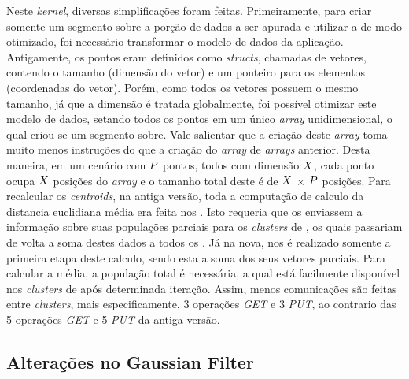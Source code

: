 \documentclass[a4paper,11pt]{article}
\begin{document}
Neste \textit{kernel}, diversas simplificações foram feitas. Primeiramente, para criar somente um segmento sobre a porção de dados a ser apurada e utilizar a \async de modo otimizado, foi necessário transformar o modelo de dados da aplicação. Antigamente, os pontos eram definidos como \textit{structs}, chamadas de vetores, contendo o tamanho (dimensão do vetor) e um ponteiro para os elementos (coordenadas do vetor). Porém, como todos os vetores possuem o mesmo tamanho, já que a dimensão é tratada globalmente, foi possível otimizar este modelo de dados, setando todos os pontos em um único \textit{array} unidimensional, o qual criou-se um segmento sobre. Vale salientar que a criação deste \textit{array} toma muito menos instruções do que a criação do \textit{array} de \textit{arrays} anterior. Desta maneira, em um cenário com $\mathnormal{P}$ pontos, todos com dimensão $\mathnormal{X}$, cada ponto ocupa $\mathnormal{X}$ posições do \textit{array} e o tamanho total deste é de $\mathnormal{X}$ $\times$ $\mathnormal{P}$ posições. Para recalcular os \textit{centroids}, na antiga versão, toda a computação de calculo da distancia euclidiana média era feita nos \ccs. Isto requeria que os \ccs enviassem a informação sobre suas populações parciais para os \textit{clusters} de \io, os quais passariam de volta a soma destes dados a todos os \ccs. Já na nova, nos \ccs é realizado somente a primeira etapa deste calculo, sendo esta a soma dos seus vetores parciais. Para calcular a média, a população total é necessária, a qual está facilmente disponível nos \textit{clusters} de \io após determinada iteração. Assim, menos comunicações são feitas entre \textit{clusters}, mais especificamente, 3 operações \textit{GET} e 3 \textit{PUT}, ao contrario das 5 operações \textit{GET} e 5 \textit{PUT} da antiga versão.
\subsection{Alterações no Gaussian Filter}
\end{document}
